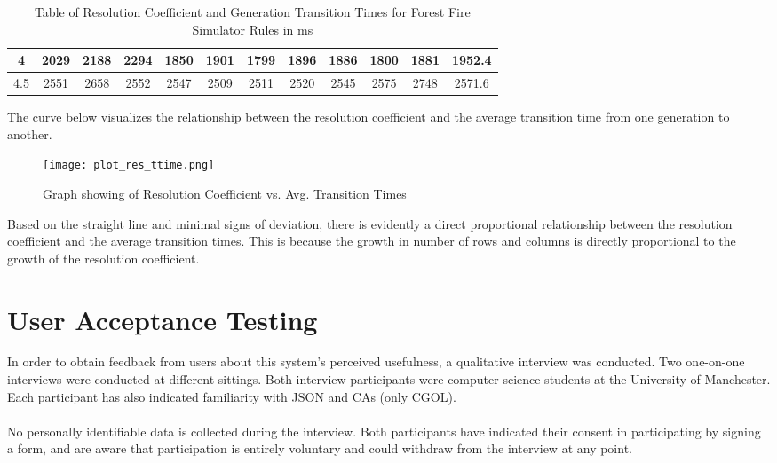 \begin{table}[H]
\begin{tabular}{|c|cccccccccc|c|}
4                                                                 & \multicolumn{1}{c|}{2029} & \multicolumn{1}{c|}{2188} & \multicolumn{1}{c|}{2294} & \multicolumn{1}{c|}{1850} & \multicolumn{1}{c|}{1901} & \multicolumn{1}{c|}{1799} & \multicolumn{1}{c|}{1896} & \multicolumn{1}{c|}{1886} & \multicolumn{1}{c|}{1800} & 1881 & 1952.4       \\ \hline
4.5                                                               & \multicolumn{1}{c|}{2551} & \multicolumn{1}{c|}{2658} & \multicolumn{1}{c|}{2552} & \multicolumn{1}{c|}{2547} & \multicolumn{1}{c|}{2509} & \multicolumn{1}{c|}{2511} & \multicolumn{1}{c|}{2520} & \multicolumn{1}{c|}{2545} & \multicolumn{1}{c|}{2575} & 2748 & 2571.6       \\ \hline
\end{tabular}
\caption{Table of Resolution Coefficient and Generation Transition Times for Forest Fire Simulator Rules in ms}
\end{table}
\noindent The curve below visualizes the relationship between the resolution coefficient and the average transition time from one generation to another. 
\begin{figure}[H]
    \caption{Graph showing of Resolution Coefficient vs. Avg. Transition Times}
    \centering
    \texttt{[image: plot\_res\_ttime.png]}
\end{figure}
\noindent Based on the straight line and minimal signs of deviation, there is evidently a direct proportional relationship between the resolution coefficient and the average transition times. This is because the growth in number of rows and columns is directly proportional to the growth of the resolution coefficient. 

\newpage
\section{User Acceptance Testing}
In order to obtain feedback from users about this system's perceived usefulness, a qualitative interview was conducted. Two one-on-one interviews were conducted at different sittings. Both interview participants were computer science students at the University of Manchester. Each participant has also indicated familiarity with JSON and CAs (only CGOL). 
\\ \\
No personally identifiable data is collected during the interview. Both participants have indicated their consent in participating by signing a form, and are aware that participation is entirely voluntary and could withdraw from the interview at any point. 
